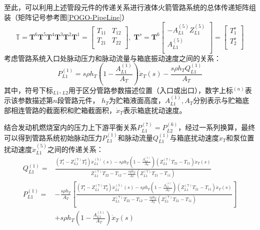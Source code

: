 至此，可以利用上述管段元件的传递关系进行液体火箭管路系统的总体传递矩阵组装（矩阵记号参考图\ref{POGO-PipeLine}）
\begin{equation}
	\boldsymbol{\mathbb{T}}=\boldsymbol{T}^6\boldsymbol{T}^5\boldsymbol{T}^4\boldsymbol{T}^3\boldsymbol{T}^2\boldsymbol{T}^1=\left[ \begin{matrix}
	   {T}_{11} & {T}_{12}  \\
	   {T}_{21} & {T}_{22}  \\
	\end{matrix} \right],\; 
	\boldsymbol{T}^s=\boldsymbol{T}^6 \left[ 
	\begin{matrix}
	   -A_{L1}^{(5)}Z_{L1}^{(5)}  \\
	   A_{L1}^{(5)}  \\
	\end{matrix} \right] = \left[ \begin{matrix}
	   {T}_{1}^s  \\
	   {T}_{2}^s  \\
	\end{matrix} \right]
\end{equation}
考虑管路系统入口处脉动压力和脉动流量与箱底振动速度之间的关系：
\begin{equation}
	\label{eq:Inlet-Boundary-Condition}
	P_{L1}^{(1)}=s\rho{h}_T\left(1-\frac{A_{L1}^{(1)}}{A_T}\right){\dot{x}_T}(s)- \frac{s\rho{h_T}Q_{L1}^{(1)}}{A_T}
\end{equation}
其中，符号下标${}_{L1},{}_{L2}$用于区分管路参数描述位置（入口或出口），数字上标${}^{(n)}$表示该参数描述第$n$段管路元件， $h_T$为贮箱液面高度，$A_{L1}^{(1)}, A_T$分别表示与贮箱底部相连管路的截面积和贮箱截面积，$\dot{x}_T$表示箱底扰动速度。

结合发动机燃烧室内的压力上下游平衡关系$P_{L1}^{(7)}=P_{L2}^{(6)}$，经过一系列换算，最终可以得到管路系统初始脉动压力$P_{L1}^{(1)}$和脉动流量$Q_{L1}^{(1)}$与箱底扰动速度$\dot{x}_T$和泵位置扰动速度$\dot{x}_{L1}^{(5)}$之间的传递关系：
\begin{align}
  \label{eq:Total-Transfer}
  Q_{L1}^{(1)}=&\frac{\left( {T}_{1}^{s}-Z_{L1}^{(7)} {T}_{2}^{s} \right)\dot{x}_{L1}^{(5)}(s)- s{\rho}{h_T}\left( 1- {\displaystyle \frac{A_{L1}^{(1)}}{A_T}} \right) \left( Z_{L1}^{(7)} {T}_{21}- {T}_{11} \right) {\dot{x}_T(s)} } {Z_{L1}^{(7)} {T}_{22}- {T}_{12}- {\displaystyle \frac{s\rho h_T}{A_T}} \left( Z_{L1}^{(7)} {T}_{21}- {T}_{11} \right)} \nonumber\\
  P_{L1}^{(1)}=%
  &-\frac{s\rho{h_T}}{A_T} \left[
  \frac{\left( {T}_{1}^{s}-Z_{L1}^{(7)} {T}_{2}^{s} \right)\dot{x}_{L1}^{(5)}(s)- s{\rho}{h_T}\left( 1- { \frac{A_{L1}^{(1)}}{A_T}} \right) \left( Z_{L1}^{(7)} {T}_{21}- {T}_{11} \right) {\dot{x}_T(s)} } {Z_{L1}^{(7)} {T}_{22}- {T}_{12}- { \frac{s\rho h_T}{A_T}} \left( Z_{L1}^{(7)} {T}_{21}- {T}_{11} \right)}
  \right] \nonumber\\
  &+ s\rho{h}_T \left(1- \frac{A_{L1}^{(1)}}{A_T}\right){\dot{x}_T}(s)
\end{align}

